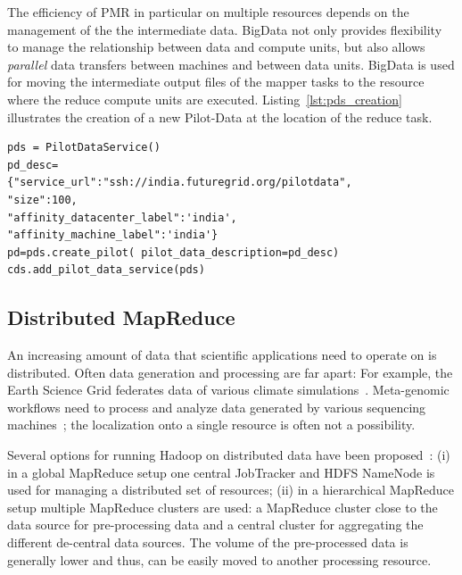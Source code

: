 \documentclass[12pt]{report}
\newcommand{\upp}{\vspace*{-0.5em}}
\newcommand{\pilotmapreduce}{Pilot-MapReduce\xspace}
\begin{document}

The efficiency of PMR in particular on multiple resources depends on
the management of the the intermediate data. BigData not only
provides flexibility to manage the relationship between data and
compute units, but also allows {\it parallel} data transfers between
machines and between data units.  BigData is used for moving the
intermediate output files of the mapper tasks to the resource where
the reduce compute units are executed.  Listing~\ref{lst:pds_creation}
illustrates the creation of a new Pilot-Data at the location of the
reduce task.

\lstset{
language=Python,
frame=single,
captionpos=b,
stringstyle=\ttfamily,
basicstyle=\scriptsize\ttfamily
}
\noindent\begin{minipage}{1 \textwidth}
\begin{lstlisting}[caption={\textbf{Pilot Data Creation:} Instantiation of a Pilot Data using Pilot Data Description}, label={lst:pds_creation}]
pds = PilotDataService()
pd_desc=
{"service_url":"ssh://india.futuregrid.org/pilotdata",
"size":100,
"affinity_datacenter_label":'india',
"affinity_machine_label":'india'}
pd=pds.create_pilot( pilot_data_description=pd_desc)
cds.add_pilot_data_service(pds)
\end{lstlisting}
\end{minipage}

\upp
\subsection{Distributed MapReduce}
\label{sec:pmr-distributed}
An increasing amount of data that scientific applications need to
operate on is distributed. Often data generation
and processing are far apart: For example, the Earth Science Grid
federates data of various climate simulations~\cite{ESG}. Meta-genomic
workflows need to process and analyze data generated by various
sequencing machines~\cite{Jha:2011fk}; the localization onto a single
resource is often not a possibility.

Several options for running Hadoop on distributed data have been
proposed~\cite{weissman-mr-11}: (i) in a global MapReduce setup one
central JobTracker and HDFS NameNode is used for managing a
distributed set of resources; (ii) in a hierarchical MapReduce setup
multiple MapReduce clusters are used: a MapReduce cluster close to the
data source for pre-processing data and a central cluster for
aggregating the different de-central data sources. The volume of the
pre-processed data is generally lower and thus, can be easily moved to
another processing resource. 
\end{document}
